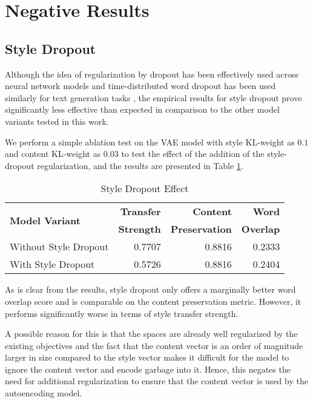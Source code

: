\section{Negative Results}

\subsection{Style Dropout}

Although the idea of regularization by dropout \citep{srivastava2014dropout} has been effectively used across neural network models and time-distributed word dropout has been used similarly for text generation tasks \citep{dai2015semi, bowman2016generating}, the empirical results for style dropout prove significantly less effective than expected in comparison to the other model variants tested in this work.

We perform a simple ablation test on the VAE model with style KL-weight as $0.1$ and content KL-weight as $0.03$ to test the effect of the addition of the style-dropout regularization, and the results are presented in Table \ref{tab:style-dropout-results}.

\begin{table}[ht]
	\centering
	\begin{tabular}{| l | r | r | r |}
		\hline
		\multirow{2}{*}{
		\textbf{Model Variant}} & \textbf{Transfer} & \textbf{Content}      & \textbf{Word}    \\
		                        & \textbf{Strength} & \textbf{Preservation} & \textbf{Overlap} \\
		\hline
		\hline
		Without Style Dropout   & 0.7707            & 0.8816                & 0.2333           \\
		\hline
		With Style Dropout      & 0.5726            & 0.8816                & 0.2404           \\
		\hline
	\end{tabular}
	\caption{Style Dropout Effect}
	\label{tab:style-dropout-results}
\end{table}

As is clear from the results, style dropout only offers a marginally better word overlap score and is comparable on the content preservation metric. However, it performs significantly worse in terms of style transfer strength.

A possible reason for this is that the spaces are already well regularized by the existing objectives and the fact that the content vector is an order of magnitude larger in size compared to the style vector makes it difficult for the model to ignore the content vector and encode garbage into it. Hence, this negates the need for additional regularization to ensure that the content vector is used by the autoencoding model.

